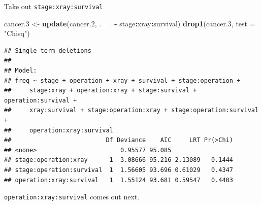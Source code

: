 \documentclass[ignorenonframetext,]{beamer}
\newenvironment{Shaded}{\begin{snugshade}}{\end{snugshade}}
\newcommand{\DataTypeTok}[1]{\textcolor[rgb]{0.13,0.29,0.53}{#1}}
\newcommand{\FloatTok}[1]{\textcolor[rgb]{0.00,0.00,0.81}{#1}}
\newcommand{\KeywordTok}[1]{\textcolor[rgb]{0.13,0.29,0.53}{\textbf{#1}}}
\newcommand{\NormalTok}[1]{#1}
\newcommand{\OperatorTok}[1]{\textcolor[rgb]{0.81,0.36,0.00}{\textbf{#1}}}
\newcommand{\StringTok}[1]{\textcolor[rgb]{0.31,0.60,0.02}{#1}}
\begin{document}
\begin{frame}[fragile]{Take out \texttt{stage:xray:survival}}
\protect\hypertarget{take-out-stagexraysurvival}{}

\scriptsize

\begin{Shaded}
\begin{Highlighting}[]
\NormalTok{cancer}\FloatTok{.3}\NormalTok{ <-}\StringTok{ }\KeywordTok{update}\NormalTok{(cancer}\FloatTok{.2}\NormalTok{, . }\OperatorTok{~}\StringTok{ }\NormalTok{. }\OperatorTok{-}\StringTok{ }\NormalTok{stage}\OperatorTok{:}\NormalTok{xray}\OperatorTok{:}\NormalTok{survival)}
\KeywordTok{drop1}\NormalTok{(cancer}\FloatTok{.3}\NormalTok{, }\DataTypeTok{test =} \StringTok{"Chisq"}\NormalTok{)}
\end{Highlighting}
\end{Shaded}

\begin{verbatim}
## Single term deletions
## 
## Model:
## freq ~ stage + operation + xray + survival + stage:operation + 
##     stage:xray + operation:xray + stage:survival + operation:survival + 
##     xray:survival + stage:operation:xray + stage:operation:survival + 
##     operation:xray:survival
##                          Df Deviance    AIC     LRT Pr(>Chi)
## <none>                       0.95577 95.085                 
## stage:operation:xray      1  3.08666 95.216 2.13089   0.1444
## stage:operation:survival  1  1.56605 93.696 0.61029   0.4347
## operation:xray:survival   1  1.55124 93.681 0.59547   0.4403
\end{verbatim}

\normalsize

\texttt{operation:xray:survival} comes out next.

\end{frame}
\end{document}
